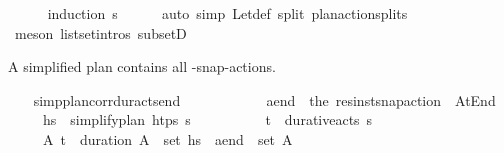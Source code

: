 \begin{isabellebody}
\ \ \ \ \isamarkupfalse%
\ {\isacharparenleft}{\kern0pt}induction\ {\isasympi}s{\isacharparenright}{\kern0pt}\isanewline
\ \ \ \ \isamarkupfalse%
\ {\isacharparenleft}{\kern0pt}auto\ simp{\isacharcolon}{\kern0pt}\ Let{\isacharunderscore}{\kern0pt}def\ split{\isacharcolon}{\kern0pt}\ plan{\isacharunderscore}{\kern0pt}action{\isachardot}{\kern0pt}splits{\isacharparenright}{\kern0pt}\isanewline
\ \ \ \ \isamarkupfalse%
\ {\isacharparenleft}{\kern0pt}meson\ list{\isachardot}{\kern0pt}set{\isacharunderscore}{\kern0pt}intros{\isacharparenleft}{\kern0pt}{}{\isacharparenright}{\kern0pt}\ subsetD{\isacharparenright}{\kern0pt}\isanewline
\ \ \ \ \isamarkupfalse%
%
\endisatagproof
{\isafoldproof}%
%
\isadelimproof
%
\endisadelimproof
%
\begin{isamarkuptext}%
A simplified plan contains all -snap-actions.%
\end{isamarkuptext}\isamarkuptrue%
\ \ \isamarkupfalse%
\ simp{\isacharunderscore}{\kern0pt}plan{\isacharunderscore}{\kern0pt}corr{\isacharunderscore}{\kern0pt}dur{\isacharunderscore}{\kern0pt}acts{\isacharunderscore}{\kern0pt}end{\isacharcolon}{\kern0pt}\ \isanewline
\ \ \ \ \ {\isasympi}\isanewline
\ \ \ \ \ {\isachardoublequoteopen}a\isactrlsub e\isactrlsub n\isactrlsub d\ {\isasymequiv}\ the\ {\isacharparenleft}{\kern0pt}res{\isacharunderscore}{\kern0pt}inst{\isacharunderscore}{\kern0pt}snap{\isacharunderscore}{\kern0pt}action\ {\isasympi}\ At{\isacharunderscore}{\kern0pt}End{\isacharparenright}{\kern0pt}{\isachardoublequoteclose}\isanewline
\ \ \ \ \ {\isachardoublequoteopen}hs\ {\isacharequal}{\kern0pt}\ simplify{\isacharunderscore}{\kern0pt}plan\ htps\ {\isasympi}s{\isachardoublequoteclose}\ \isanewline
\ \ \ \ \ \ \ \ \ {\isachardoublequoteopen}{\isacharparenleft}{\kern0pt}t\isactrlsub {\isasympi}{\isacharcomma}{\kern0pt}{\isasympi}{\isacharparenright}{\kern0pt}\ {\isasymin}\ durative{\isacharunderscore}{\kern0pt}acts\ {\isasympi}s{\isachardoublequoteclose}\isanewline
\ \ \ \ \ {\isachardoublequoteopen}{\isasymexists}A{\isachardot}{\kern0pt}\ {\isacharparenleft}{\kern0pt}t\isactrlsub {\isasympi}\ {\isacharplus}{\kern0pt}\ {\isacharparenleft}{\kern0pt}duration\ {\isasympi}{\isacharparenright}{\kern0pt}{\isacharcomma}{\kern0pt}A{\isacharparenright}{\kern0pt}\ {\isasymin}\ set\ hs\ {\isasymand}\ a\isactrlsub e\isactrlsub n\isactrlsub d\ {\isasymin}\ set\ A{\isachardoublequoteclose}\isanewline

\end{isabellebody}
